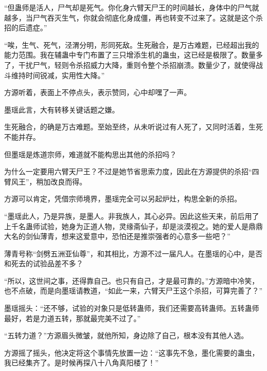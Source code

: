 \begin{this_body}
“但蛊师是活人，尸气却是死气。你化身六臂天尸王的时间越长，身体中的尸气就越多，当尸气吞灭生气，你就会彻底化身成僵，再也转变不过来了。这就是这个杀招的后遗症。”

“唉，生气、死气，泾渭分明，形同死敌。生死融合，是万古难题，已经超出我的能力范围。我在辅蛊中专门布置了三只增添生机的蛊虫，这已经是极限了。数量多了，干扰尸气，轻则令杀招威力大降，重则令整个杀招崩溃。数量少了，就使得战斗维持时间锐减，实用性大降。”

方源听着，表面上不停点头，表示赞同，心中却嘿了一声。

墨瑶此言，大有转移关键话题之嫌。

生死融合，的确是万古难题。至始至终，从未听说过有人死了，又同时活着，生死不能并存。

但墨瑶是炼道宗师，难道就不能构思出其他的杀招吗？

为什么一定要用六臂天尸王？不过是她节省思索力度，因此在方源提供的杀招“四臂风王”，稍加改良而得。

方源可以肯定，凭借宗师境界，墨瑶完全可以另起炉灶，构思全新的杀招。

“墨瑶此人，乃是异族，是墨人。非我族人，其心必异。因此这些天来，前后用了上千名蛊师试验，她身为正道人物，灵缘斋仙子，却是淡漠视之。她的爱人是鼎鼎大名的剑仙薄青，想来这爱意中，恐怕还是推崇强者的心意多一些吧？”

薄青号称“剑劈五洲亚仙尊”，和其相比，方源不过一届凡人。在墨瑶的心中，是否和死去的试验品差不多？

“所以，这世间之事，还得靠自己。也只有自己，才是最可靠的。”方源暗中冷笑，也不点破，而是向墨瑶请教道，“如此一来，六臂天尸王这个杀招，可算完善了？”

墨瑶摇头：“还不够，试验的对象只是低转蛊师，我们还需要高转蛊师。五转蛊师最好，若是力道五转，那就最完美不过了。”

“五转力道？”方源眉头微皱，就他所知，身边除了自己，根本没有其他人选。

方源摇了摇头，他决定将这个事情先放置一边：“这事先不急，墨化需要的蛊虫，我已经集齐了。是时候再探八十八角真阳楼了！”

\end{this_body}


